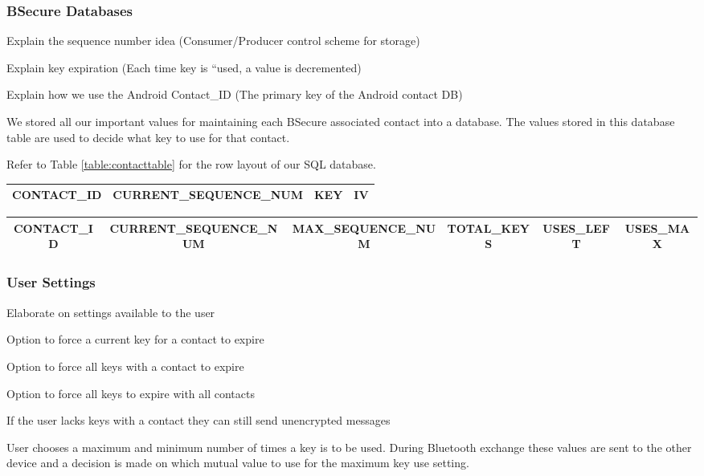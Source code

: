 \subsubsection{BSecure Databases}
Explain the sequence number idea (Consumer/Producer control scheme for storage)

Explain key expiration (Each time key is ``used, a value is decremented)

Explain how we use the Android Contact\_ID (The primary key of the Android contact DB)

We stored all our important values for maintaining each BSecure associated contact
into a database. The values stored in this database table are used to decide what key to use for that
contact.

Refer to Table \ref{table:contacttable} for the row layout of our SQL database.

\begin{table*}
\centering
\caption{Key Table Design}
\label{table:contacttable}
\begin{tabular}{|c|c|c|c|} \hline
CONTACT\_ID&CURRENT\_SEQUENCE\_NUM&KEY&IV\\ \hline\end{tabular}
\end{table*}

\begin{table*}
\centering
\caption{Contact Table Design}
\label{table:contacttable}
\begin{tabular}{|c|c|c|c|c|c|} \hline
CONTACT\_ID&CURRENT\_SEQUENCE\_NUM&MAX\_SEQUENCE\_NUM&TOTAL\_KEYS&USES\_LEFT&USES\_MAX\\ \hline\end{tabular}
\end{table*}


\subsubsection{User Settings}
Elaborate on settings available to the user

Option to force a current key for a contact to expire

Option to force all keys with a contact to expire

Option to force all keys to expire with all contacts

If the user lacks keys with a contact they can still send unencrypted messages

User chooses a maximum and minimum number of times a key is to be used. During Bluetooth exchange
these values are sent to the other device and a decision is made on which mutual value to use for the maximum key use setting.

